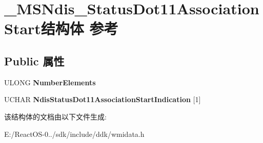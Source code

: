 \hypertarget{struct___m_s_ndis___status_dot11_association_start}{}\section{\+\_\+\+M\+S\+Ndis\+\_\+\+Status\+Dot11\+Association\+Start结构体 参考}
\label{struct___m_s_ndis___status_dot11_association_start}
\subsection*{Public 属性}
\begin{DoxyCompactItemize}
\item 
\mbox{\label{struct___m_s_ndis___status_dot11_association_start_a2a4824da64457edd1794903fc243f64e}} 
U\+L\+O\+NG {\bfseries Number\+Elements}
\item 
\mbox{\label{struct___m_s_ndis___status_dot11_association_start_a07aae03398c11b50b40727b9ed00f983}} 
U\+C\+H\+AR {\bfseries Ndis\+Status\+Dot11\+Association\+Start\+Indication} \mbox{[}1\mbox{]}
\end{DoxyCompactItemize}


该结构体的文档由以下文件生成\+:\begin{DoxyCompactItemize}
\item 
E\+:/\+React\+O\+S-\/0../sdk/include/ddk/wmidata.\+h\end{DoxyCompactItemize}
